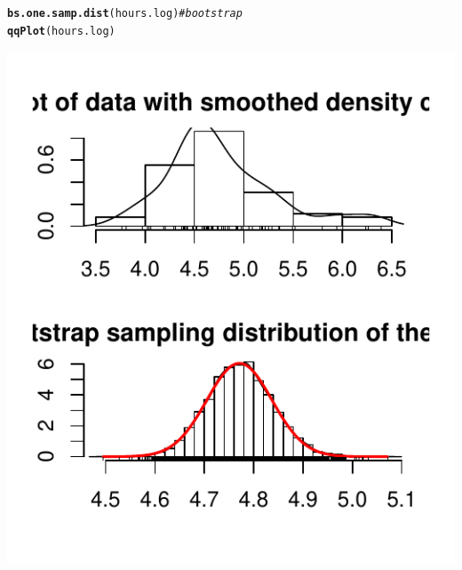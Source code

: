 \documentclass{article}\usepackage[]{graphicx}\usepackage[]{color}
\makeatletter
\def\maxwidth{ %
  \ifdim\Gin@nat@width>\linewidth
    \linewidth
  \else
    \Gin@nat@width
  \fi
}
\newcommand{\hlcom}[1]{\textcolor[rgb]{0.678,0.584,0.686}{\textit{#1}}}%
\newcommand{\hlstd}[1]{\textcolor[rgb]{0.345,0.345,0.345}{#1}}%
\newcommand{\hlkwd}[1]{\textcolor[rgb]{0.737,0.353,0.396}{\textbf{#1}}}%
\newenvironment{kframe}{%
 \def\at@end@of@kframe{}%
 \ifinner\ifhmode%
  \def\at@end@of@kframe{\end{minipage}}%
  \begin{minipage}{\columnwidth}%
 \fi\fi%
 \def\FrameCommand##1{\hskip\@totalleftmargin \hskip-\fboxsep
 \colorbox{shadecolor}{##1}\hskip-\fboxsep
     \hskip-\linewidth \hskip-\@totalleftmargin \hskip\columnwidth}%
 \MakeFramed {\advance\hsize-\width
   \@totalleftmargin\z@ \linewidth\hsize
   \@setminipage}}%
 {\par\unskip\endMakeFramed%
 \at@end@of@kframe}
\newenvironment{knitrout}{}{} %
\makeatother
\begin{document}
\begin{knitrout}
{}



\end{knitrout}

\begin{knitrout}
\color{fgcolor}\begin{kframe}
\begin{alltt}
\hlkwd{bs.one.samp.dist}\hlstd{(hours.log)} \hlcom{# bootstrap}
\hlkwd{qqPlot}\hlstd{(hours.log)}
\end{alltt}
\end{kframe}

{\centering \includegraphics[width=\maxwidth]{figure/2_c_boot-1} 
}
\end{knitrout}
\end{document}
